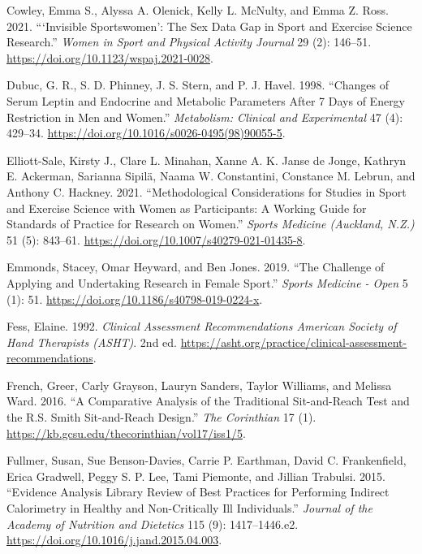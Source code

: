 \documentclass[
]{article}
\newlength{\cslhangindent}
\newenvironment{CSLReferences}[2] %
 {\begin{list}{}{%
  \setlength{\itemindent}{0pt}
  \setlength{\leftmargin}{0pt}
  \setlength{\parsep}{0pt}
  \ifodd #1
   \setlength{\leftmargin}{\cslhangindent}
   \setlength{\itemindent}{-1\cslhangindent}
  \fi
  \setlength{\itemsep}{#2\baselineskip}}}
 {\end{list}}
\begin{document}
\begin{CSLReferences}{1}{0}
Cowley, Emma S., Alyssa A. Olenick, Kelly L. McNulty, and Emma Z. Ross. 2021. {``{`{Invisible} {Sportswomen}'}: {The} {Sex} {Data} {Gap} in {Sport} and {Exercise} {Science} {Research}.''} \emph{Women in Sport and Physical Activity Journal} 29 (2): 146--51. \url{https://doi.org/10.1123/wspaj.2021-0028}.

Dubuc, G. R., S. D. Phinney, J. S. Stern, and P. J. Havel. 1998. {``Changes of Serum Leptin and Endocrine and Metabolic Parameters After 7 Days of Energy Restriction in Men and Women.''} \emph{Metabolism: Clinical and Experimental} 47 (4): 429--34. \url{https://doi.org/10.1016/s0026-0495(98)90055-5}.

Elliott-Sale, Kirsty J., Clare L. Minahan, Xanne A. K. Janse de Jonge, Kathryn E. Ackerman, Sarianna Sipilä, Naama W. Constantini, Constance M. Lebrun, and Anthony C. Hackney. 2021. {``Methodological {Considerations} for {Studies} in {Sport} and {Exercise} {Science} with {Women} as {Participants}: {A} {Working} {Guide} for {Standards} of {Practice} for {Research} on {Women}.''} \emph{Sports Medicine (Auckland, N.Z.)} 51 (5): 843--61. \url{https://doi.org/10.1007/s40279-021-01435-8}.

Emmonds, Stacey, Omar Heyward, and Ben Jones. 2019. {``The {Challenge} of {Applying} and {Undertaking} {Research} in {Female} {Sport}.''} \emph{Sports Medicine - Open} 5 (1): 51. \url{https://doi.org/10.1186/s40798-019-0224-x}.

Fess, Elaine. 1992. \emph{Clinical {Assessment} {Recommendations} {\textbar} {American} {Society} of {Hand} {Therapists} ({ASHT})}. 2nd ed. \url{https://asht.org/practice/clinical-assessment-recommendations}.

French, Greer, Carly Grayson, Lauryn Sanders, Taylor Williams, and Melissa Ward. 2016. {``A {Comparative} {Analysis} of the {Traditional} {Sit}-and-{Reach} {Test} and the {R}.{S}. {Smith} {Sit}-and-{Reach} {Design}.''} \emph{The Corinthian} 17 (1). \url{https://kb.gcsu.edu/thecorinthian/vol17/iss1/5}.

Fullmer, Susan, Sue Benson-Davies, Carrie P. Earthman, David C. Frankenfield, Erica Gradwell, Peggy S. P. Lee, Tami Piemonte, and Jillian Trabulsi. 2015. {``Evidence Analysis Library Review of Best Practices for Performing Indirect Calorimetry in Healthy and Non-Critically Ill Individuals.''} \emph{Journal of the Academy of Nutrition and Dietetics} 115 (9): 1417--1446.e2. \url{https://doi.org/10.1016/j.jand.2015.04.003}.


\end{CSLReferences}
\end{document}
